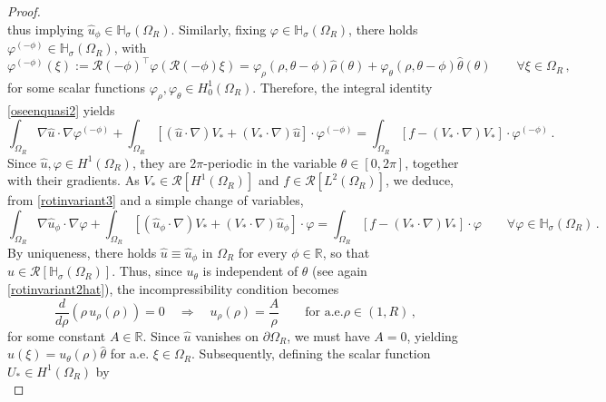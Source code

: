 \documentclass[a4paper,11pt]{article}
\numberwithin{equation}{section}
\numberwithin{figure}{section}
\begin{document}
\begin{proof}
$$$$
thus implying $\widehat{u}_{\phi} \in \mathbb{H}_{\sigma}(\Omega_{R})$. Similarly, fixing $\varphi \in \mathbb{H}_{\sigma}(\Omega_{R})$, there holds $\varphi^{(-\phi)} \in \mathbb{H}_{\sigma}(\Omega_{R})$, with
$$
\varphi^{(-\phi)}(\xi) := \mathcal{R}(-\phi)^{\top} \varphi(\mathcal{R}(-\phi) \xi) = \varphi_{\rho}(\rho, \theta - \phi) \widehat{\rho}(\theta) + \varphi_{\theta}(\rho, \theta - \phi) \widehat{\theta}(\theta) \qquad
\forall \xi \in \Omega_{R} \, ,
$$
for some scalar functions $\varphi_{\rho}, \varphi_{\theta}  \in H_{0}^{1}(\Omega_{R})$. Therefore, the integral identity \eqref{oseenquasi2} yields
\begin{equation} \label{rotinvariant3}
\int_{\Omega_{R}} \nabla \widehat{u} \cdot \nabla \varphi^{(-\phi)} + \int_{\Omega_{R}} \left[ (\widehat{u} \cdot \nabla)V_{*} + (V_{*} \cdot \nabla)\widehat{u} \right] \cdot \varphi^{(-\phi)}  = \int_{\Omega_{R}} \left[ f - (V_{*} \cdot \nabla)V_{*} \right] \cdot \varphi^{(-\phi)} \, .
\end{equation}
Since $\widehat{u}, \varphi \in H^{1}(\Omega_{R})$, they are $2\pi$-periodic in the variable $\theta \in [0, 2 \pi]$, together with their gradients. As $ V_{*} \in \mathcal{R}[H^{1}(\Omega_{R})]$ and $f \in \mathcal{R}[L^{2}(\Omega_{R})]$, we deduce, from \eqref{rotinvariant3} and a simple change of variables,
\begin{equation} \label{rotinvariant4}
	\int_{\Omega_{R}} \nabla \widehat{u}_{\phi} \cdot \nabla \varphi + \int_{\Omega_{R}} \left[ (\widehat{u}_{\phi} \cdot \nabla)V_{*} + (V_{*} \cdot \nabla)\widehat{u}_{\phi} \right] \cdot \varphi  = \int_{\Omega_{R}} \left[ f - (V_{*} \cdot \nabla)V_{*} \right] \cdot \varphi \qquad \forall \varphi \in \mathbb{H}_{\sigma}(\Omega_{R}) \, .
\end{equation}
By uniqueness, there holds $\widehat{u} \equiv \widehat{u}_{\phi}$ in $\Omega_{R}$ for every $\phi \in \mathbb{R}$, so that $\widehat{u}\in\mathcal{R}[\mathbb{H}_{\sigma}(\Omega_{R})]$. Thus, since $u_{\theta}$ is independent
of $\theta$ (see again \eqref{rotinvariant2hat}), the incompressibility condition becomes
$$
\dfrac{d}{d\rho}(\rho \, u_{\rho}(\rho)) = 0 \quad \Longrightarrow \quad u_{\rho}(\rho) = \dfrac{A}{\rho} \qquad\text{for a.e.
}\rho\in(1,R) \, ,
$$
for some constant $A \in \mathbb{R}$. Since $\widehat{u}$ vanishes on $\partial \Omega_{R}$, we must have $A=0$, yielding $\widehat{u}(\xi) = u_{\theta}(\rho) \widehat{\theta}$ for a.e. $\xi \in \Omega_{R}$. Subsequently, defining the scalar function $U_{*} \in H^{1}(\Omega_{R})$ by
\begin{equation} \label{rotinvariant5}

\end{equation}
\end{proof}
\end{document}

